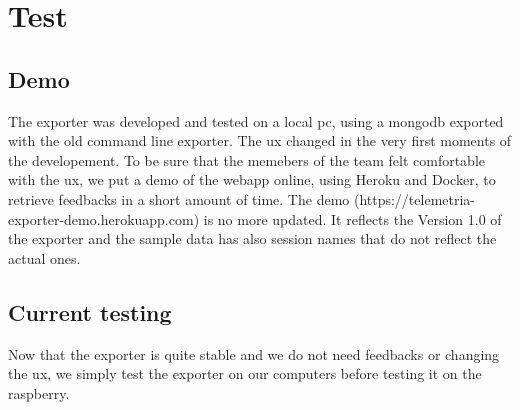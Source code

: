 \section{\huge{Test}}

\subsection{Demo}
The exporter was developed and tested on a local pc, using a mongodb exported with the old command line exporter.
The ux changed in the very first moments of the developement. To be sure that the memebers of the team felt comfortable with the ux,
we put a demo of the webapp online, using Heroku and Docker, to retrieve feedbacks in a short amount of time.
The demo (https://telemetria-exporter-demo.herokuapp.com) is no more updated. It reflects the Version 1.0 of the exporter and the sample
data has also session names that do not reflect the actual ones.

\subsection{Current testing}
Now that the exporter is quite stable and we do not need feedbacks or changing the ux, we simply test the exporter on our computers before 
testing it on the raspberry.